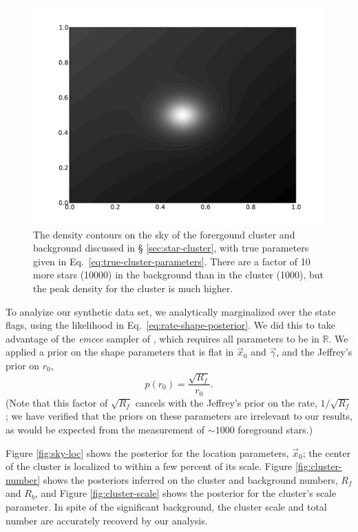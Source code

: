 \documentclass[aps,prd]{revtex4-1}
\begin{document}
\begin{figure}
  \includegraphics[width=\columnwidth]{sky-density}
  \caption{\label{fig:sky-density} The density contours on the sky of
    the forergound cluster and background discussed in \S
    \ref{sec:star-cluster}, with true parameters given in
    Eq.~\eqref{eq:true-cluster-parameters}.  There are a factor of 10
    more stars (10000) in the background than in the cluster (1000),
    but the peak density for the cluster is much higher.}
\end{figure}

To analyize our synthetic data set, we analytically marginalized over
the state flags, using the likelihood in
Eq.~\eqref{eq:rate-shape-posterior}.  We did this to take advantage of
the \textit{emcee} sampler of \citet{ForemanMackey2012}, which
requires all parameters to be in $\mathbb{R}$.  We applied a prior on
the shape parameters that is flat in $\vec{x}_0$ and $\vec{\gamma}$,
and the Jeffrey's prior on $r_0$,
\begin{equation}
  p\left( r_0 \right) = \frac{\sqrt{R_f}}{r_0}.
\end{equation}
(Note that this factor of $\sqrt{R_f}$ cancels with the Jeffrey's
prior on the rate, $1/\sqrt{R_f}$; we have verified that the priors on
these parameters are irrelevant to our results, as would be expected
from the measurement of $\sim 1000$ foreground stars.)  

Figure \ref{fig:sky-loc} shows the posterior for the location
parameters, $\vec{x}_0$; the center of the cluster is localized to
within a few percent of its scale.  Figure \ref{fig:cluster-number}
shows the posteriors inferred on the cluster and background numbers,
$R_f$ and $R_b$, and Figure \ref{fig:cluster-scale} shows the
posterior for the cluster's scale parameter.  In spite of the
significant background, the cluster scale and total number are
accurately recoverd by our analysis.
\end{document}
